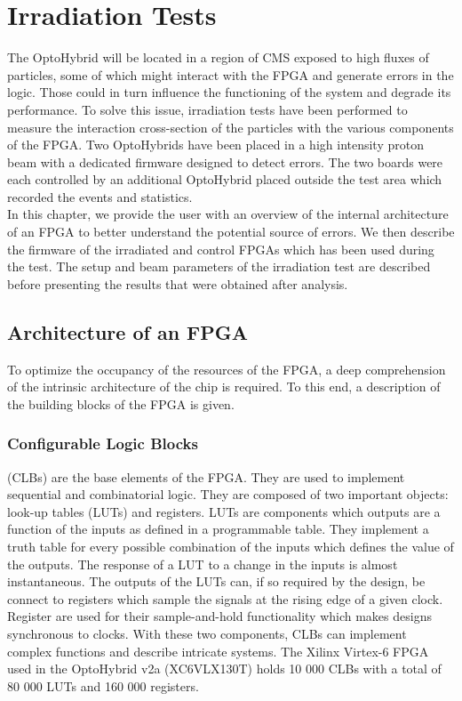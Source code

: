 \chapter{Irradiation Tests}
\label{chap:II-6-irradiation}

  The OptoHybrid will be located in a region of CMS exposed to high fluxes of particles, some of which might interact with the FPGA and generate errors in the logic. Those could in turn influence the functioning of the system and degrade its performance. To solve this issue, irradiation tests have been performed to measure the interaction cross-section of the particles with the various components of the FPGA. Two OptoHybrids have been placed in a high intensity proton beam with a dedicated firmware designed to detect errors. The two boards were each controlled by an additional OptoHybrid placed outside the test area which recorded the events and statistics. \\

  In this chapter, we provide the user with an overview of the internal architecture of an FPGA to better understand the potential source of errors. We then describe the firmware of the irradiated and control FPGAs which has been used during the test. The setup and beam parameters of the irradiation test are described before presenting the results that were obtained after analysis.

  \section{Architecture of an FPGA}

    To optimize the occupancy of the resources of the FPGA, a deep comprehension of the intrinsic architecture of the chip is required. To this end, a description of the building blocks of the FPGA is given.

    \subsection{Configurable Logic Blocks} (CLBs) are the base elements of the FPGA. They are used to implement sequential and combinatorial logic. They are composed of two important objects: look-up tables (LUTs) and registers. LUTs are components which outputs are a function of the inputs as defined in a programmable table. They implement a truth table for every possible combination of the inputs which defines the value of the outputs. The response of a LUT to a change in the inputs is almost instantaneous. The outputs of the LUTs can, if so required by the design, be connect to registers which sample the signals at the rising edge of a given clock. Register are used for their sample-and-hold functionality which makes designs synchronous to clocks. With these two components, CLBs can implement complex functions and describe intricate systems. The Xilinx Virtex-6 FPGA used in the OptoHybrid v2a (XC6VLX130T) holds 10 000 CLBs with a total of 80 000 LUTs and 160 000 registers.

